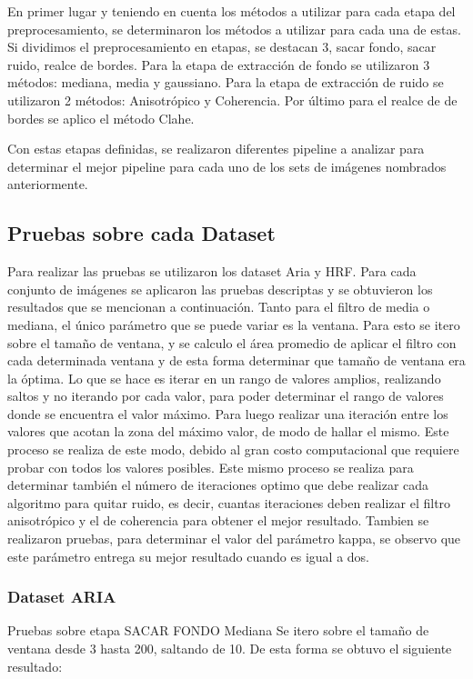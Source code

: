 En primer lugar y teniendo en cuenta los m\'etodos a utilizar para cada etapa del preprocesamiento, se determinaron los m\'etodos a utilizar para cada una de estas. Si dividimos el preprocesamiento en etapas, se destacan 3, sacar fondo, sacar ruido, realce de bordes. Para la etapa de extracci\'on de fondo se utilizaron 3 m\'etodos: mediana, media y gaussiano. Para la etapa de extracci\'on de ruido se utilizaron 2 m\'etodos: Anisotr\'opico y Coherencia. Por \'ultimo para el realce de de bordes se aplico el m\'etodo Clahe.

Con estas etapas definidas, se realizaron diferentes pipeline a analizar para determinar el mejor pipeline para cada uno de los sets de im\'agenes nombrados anteriormente.


\subsection{Pruebas sobre cada Dataset}
Para realizar las pruebas se utilizaron los dataset Aria  y HRF. Para cada conjunto de imágenes se aplicaron las pruebas descriptas y se obtuvieron los resultados que se mencionan a continuación.
Tanto para el filtro de media o mediana, el único parámetro que se puede variar es la ventana. Para esto se itero sobre el tamaño de ventana, y se calculo el área promedio de aplicar el filtro con cada determinada ventana y de esta forma determinar que tamaño de ventana era la óptima. Lo que se hace es iterar en un rango de valores amplios, realizando saltos y no iterando por cada valor, para poder determinar el rango de valores donde se encuentra el valor máximo. Para luego realizar una iteración entre los valores que acotan la zona del máximo valor, de modo de hallar el mismo.  Este proceso se realiza de este modo, debido al gran costo computacional que requiere probar con todos los valores posibles. 
Este mismo proceso se realiza para determinar también el número de iteraciones optimo que debe realizar cada algoritmo para quitar ruido, es decir, cuantas iteraciones deben realizar el filtro anisotrópico y el de coherencia para obtener el mejor resultado. Tambien se realizaron pruebas, para determinar el valor del parámetro kappa, se observo que este parámetro entrega su mejor resultado cuando es igual a dos.


\subsubsection{Dataset ARIA}

Pruebas sobre etapa SACAR  FONDO 
Mediana 
 Se itero sobre el tamaño de ventana desde 3 hasta 200, saltando de 10. De esta forma se obtuvo el siguiente resultado:


